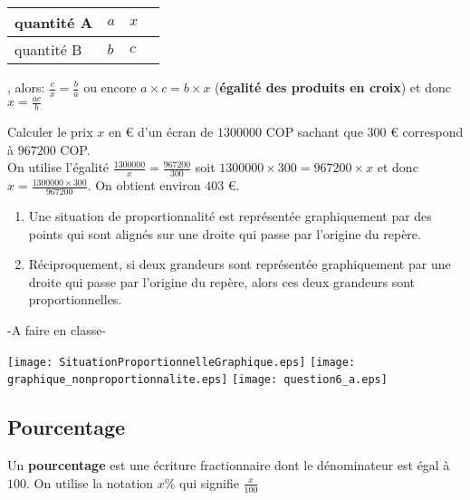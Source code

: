 \documentclass[10pt]{article}
\begin{document}
{\begin{shaded}
\begin{Pp}
	\begin{tabular}{|L{2cm}||C{1cm}|C{1cm}|C{1cm}|}
	\hline quantité A&$a$&$x$\\
	\hline quantité B&$b$&$c$\\
	\hline
	\end{tabular}
, alors: $\frac{c}{x}=\frac{b}{a}$ ou encore $a \times c = b \times x$ (\textbf{égalité des produits en croix}) et donc $x= \frac{ac}{b}$
\end{Pp}
\end{shaded}
   
\begin{Ex}   
Calculer le prix $x$ en \euro{} d'un écran de $1 300 000$ COP sachant que $300$ \euro{} correspond à $967200$ COP.
\\ On  utilise l'égalité  $\frac{1300000}{x}=\frac{967200}{300}$ soit $1300000 \times 300 = 967200 \times x$ et donc $x= \frac{1300000\times 300}{967200}$. On obtient environ $403$ \euro{}.  
\end{Ex}

\begin{shaded}
\begin{Pp}
\begin{enumerate}
\item Une situation de proportionnalité est représentée graphiquement par des points qui sont alignés sur une droite qui passe par l'origine du repère.
\item Réciproquement, si deux grandeurs sont représentée graphiquement par une droite qui passe par l'origine du repère, alors ces deux grandeurs sont proportionnelles.
\end{enumerate}
\end{Pp}
\end{shaded}

\begin{Pv}
	-A faire en classe-
\end{Pv}   

\begin{Ex} \texttt{[image: SituationProportionnelleGraphique.eps]} 
 \texttt{[image: graphique\_nonproportionnalite.eps]}
\texttt{[image: question6\_a.eps]} 
 \end{Ex}

\subsection{Pourcentage}

\begin{Df}
Un \textbf{pourcentage} est une écriture fractionnaire dont le dénominateur est égal à $100$. On utilise la notation $x \%$ qui signifie $\frac{x}{100}$
\end{Df}

}
\end{document}
